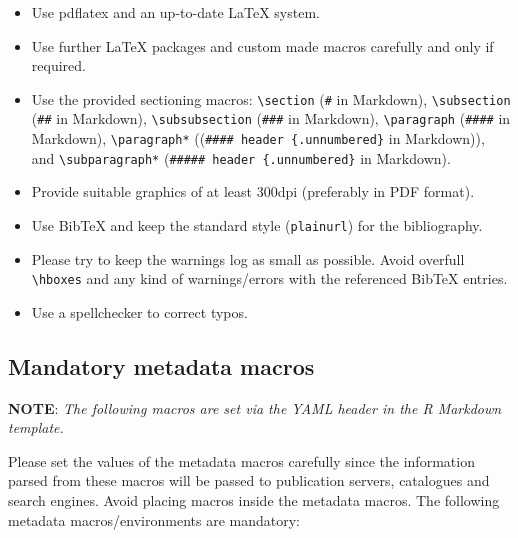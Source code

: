 \documentclass[a4paper ,UKenglish  ,cleveref ,autoref ,thm-restate   ]{lipics-v2019}
\def\tightlist{}
\begin{document}
\begin{itemize}
\tightlist
\item
  Use pdflatex and an up-to-date \LaTeX{} system.
\item
  Use further \LaTeX{} packages and custom made macros carefully and
  only if required.
\item
  Use the provided sectioning macros: \texttt{\textbackslash{}section}
  (\texttt{\#} in Markdown), \texttt{\textbackslash{}subsection}
  (\texttt{\#\#} in Markdown), \texttt{\textbackslash{}subsubsection}
  (\texttt{\#\#\#} in Markdown), \texttt{\textbackslash{}paragraph}
  (\texttt{\#\#\#\#} in Markdown), \texttt{\textbackslash{}paragraph*}
  ((\texttt{\#\#\#\#\ header\ \{.unnumbered\}} in Markdown)), and
  \texttt{\textbackslash{}subparagraph*}
  (\texttt{\#\#\#\#\#\ header\ \{.unnumbered\}} in Markdown).
\item
  Provide suitable graphics of at least 300dpi (preferably in PDF
  format).
\item
  Use BibTeX and keep the standard style (\texttt{plainurl}) for the
  bibliography.
\item
  Please try to keep the warnings log as small as possible. Avoid
  overfull \texttt{\textbackslash{}hboxes} and any kind of
  warnings/errors with the referenced BibTeX entries.
\item
  Use a spellchecker to correct typos.
\end{itemize}

\subsection*{Mandatory metadata macros}

\textbf{NOTE}: \emph{The following macros are set via the YAML header in
the R Markdown template.}

Please set the values of the metadata macros carefully since the
information parsed from these macros will be passed to publication
servers, catalogues and search engines. Avoid placing macros inside the
metadata macros. The following metadata macros/environments are
mandatory:
\end{document}
